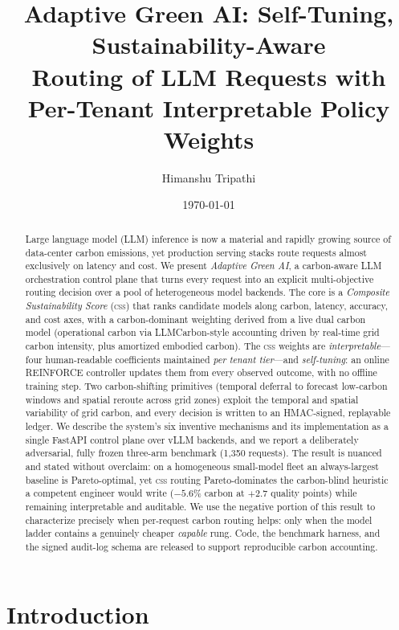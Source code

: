 \documentclass[10pt,twocolumn]{article}
\title{\textbf{Adaptive Green AI: Self-Tuning, Sustainability-Aware\\
Routing of LLM Requests with Per-Tenant Interpretable Policy Weights}}
\author[1]{Himanshu Tripathi}
\affil[1]{Hewlett Packard Enterprise \\ \texttt{himanshu.tripathi@hpe.com}}
\date{\today}
\newcommand{\css}{\textsc{css}}
\begin{document}
\maketitle

\begin{abstract}
Large language model (LLM) inference is now a material and rapidly growing
source of data-center carbon emissions, yet production serving stacks route
requests almost exclusively on latency and cost. We present \emph{Adaptive
Green AI}, a carbon-aware LLM orchestration control plane that turns every
request into an explicit multi-objective routing decision over a pool of
heterogeneous model backends. The core is a \emph{Composite Sustainability
Score} (\css) that ranks candidate models along carbon, latency, accuracy, and
cost axes, with a carbon-dominant weighting derived from a live dual carbon
model (operational carbon via LLMCarbon-style accounting driven by real-time
grid carbon intensity, plus amortized embodied carbon). The \css{} weights are
\emph{interpretable}---four human-readable coefficients maintained
\emph{per tenant tier}---and \emph{self-tuning}: an online REINFORCE controller
updates them from every observed outcome, with no offline training step.
Two carbon-shifting primitives (temporal deferral to forecast low-carbon
windows and spatial reroute across grid zones) exploit the temporal and
spatial variability of grid carbon, and every decision is written to an
HMAC-signed, replayable ledger. We describe the system's six inventive
mechanisms and its implementation as a single FastAPI control plane over vLLM
backends, and we report a deliberately adversarial, fully frozen three-arm
benchmark (1{,}350 requests). The result is nuanced and stated without
overclaim: on a homogeneous small-model fleet an always-largest baseline is
Pareto-optimal, yet \css{} routing Pareto-dominates the carbon-blind heuristic
a competent engineer would write ($-5.6\%$ carbon at $+2.7$ quality points)
while remaining interpretable and auditable. We use the negative portion of
this result to characterize precisely when per-request carbon routing helps:
only when the model ladder contains a genuinely cheaper \emph{capable} rung.
Code, the benchmark harness, and the signed audit-log schema are released to
support reproducible carbon accounting.
\end{abstract}

\section{Introduction}
\label{sec:intro}
\end{document}
